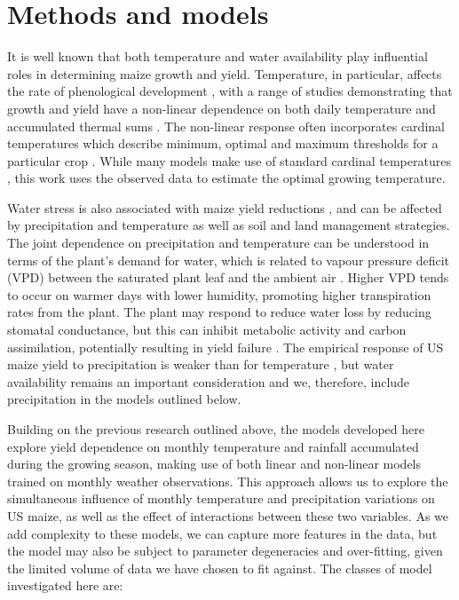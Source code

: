 \documentclass[12pt]{iopart}
\newcommand{\remove}[1]{}
\newcommand{\add}[1]{#1}
\begin{document}
\section{Methods and models}
\label{sec:models}

\add{It is well known that both temperature and water availability play influential roles in determining maize growth and yield. Temperature, in particular, affects the rate of phenological development \citep[e.g.][]{cross:1972, coelho:1980, daughtry:1984, cutforth:1990, bonhomme:1994}, with a range of studies demonstrating that growth and yield have a non-linear dependence on both daily temperature and accumulated thermal sums \citep[e.g.][]{cutforth:1990, streck:2007, schlenker:2009, lobell:2013, zhou:2018}. The non-linear response often incorporates cardinal temperatures which describe minimum, optimal and maximum thresholds for a particular crop \citep[e.g.][]{yin:1995, wang:1998, zhou:2018}. While many models make use of standard cardinal temperatures \citep[e.g.][]{yin:1995}, this work uses the observed data to estimate the optimal growing temperature.} 

\add{Water stress is also associated with maize yield reductions \citep[e.g.][and references therein]{cakir:2004, ge:2012, lobell:2013, carter:2016, song:2019}, and can be affected by precipitation and temperature as well as soil and land management strategies. The joint dependence on precipitation and temperature can be understood in terms of the plant's demand for water, which is related to vapour pressure deficit (VPD) between the saturated plant leaf and the ambient air \citep[e.g.][]{roberts:2012, lobell:2013}. Higher VPD tends to occur on warmer days with lower humidity, promoting higher transpiration rates from the plant. The plant may respond to reduce water loss by reducing stomatal conductance, but this can inhibit metabolic activity and carbon assimilation, potentially resulting in yield failure \citep[e.g.][]{song:2010, ge:2012, lobell:2013, song:2019}. The empirical response of US maize yield to precipitation is weaker than for temperature \citep[e.g.][]{lobell:2013}, but water availability remains an important consideration and we, therefore, include precipitation in the models outlined below.}

\add{Building on the previous research outlined above, the models developed here explore yield dependence on monthly temperature and rainfall accumulated during the growing season, making use of both linear and non-linear models trained on monthly weather observations. This approach allows us to explore the simultaneous influence of monthly temperature and precipitation variations on US maize, as well as the effect of interactions between these two variables.}\remove{Alongside considering different approaches for estimating yield anomalies, we have also investigated a number of different statistical models for predicting annual US maize yield based on monthly temperature and precipitation during the growing season.} As we add complexity to these models, we can capture more features in the data, but the model may also be subject to parameter degeneracies and over-fitting, given the limited volume of data we have chosen to fit against. The classes of model investigated here are:
\end{document}
